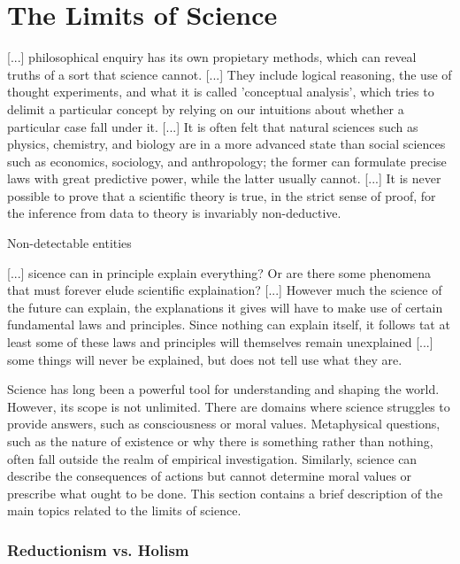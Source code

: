 %
% 

\section{The Limits of Science}

{\color{red} [...] philosophical enquiry has its own propietary methods, which can reveal truths of a sort that science cannot. [...] They include logical reasoning, the use of thought experiments, and what it is called 'conceptual analysis', which tries to delimit a particular concept by relying on our intuitions about whether a particular case fall under it. [...] It is often felt that natural sciences such as physics, chemistry, and biology are in a more advanced state than social sciences such as economics, sociology, and anthropology; the former can formulate precise laws with great predictive power, while the latter usually cannot. [...] It is never possible to prove that a scientific theory is true, in the strict sense of proof, for the inference from data to theory is invariably non-deductive.}

{\color{red} Non-detectable entities}

{\color{red} [...] sicence can in principle explain everything? Or are there some phenomena that must forever elude scientific explaination? [...] However much the science of the future can explain, the explanations it gives will have to make use of certain fundamental laws and principles. Since nothing can explain itself, it follows tat at least some of these laws and principles will themselves remain unexplained [...] some things will never be explained, but does not tell use what they are.}

Science has long been a powerful tool for understanding and shaping the world. However, its scope is not unlimited. There are domains where science struggles to provide answers, such as consciousness or moral values. Metaphysical questions, such as the nature of existence or why there is something rather than nothing, often fall outside the realm of empirical investigation. Similarly, science can describe the consequences of actions but cannot determine moral values or prescribe what ought to be done. This section contains a brief description of the main topics related to the limits of science.

\subsubsection*{Reductionism vs. Holism}

